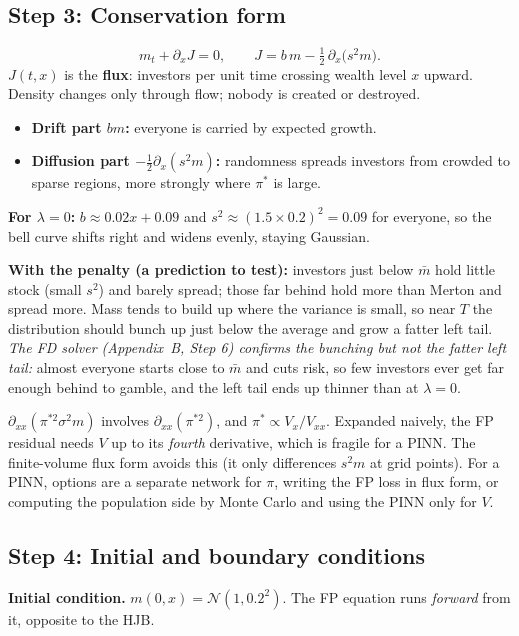 \documentclass[11pt]{article}
\newcommand{\mb}{\bar m}
\begin{document}
\subsection*{Step 3: Conservation form}
\[
  m_t + \partial_xJ = 0,\qquad J = b\,m - \tfrac12\,\partial_x\bigl(s^2m\bigr).
\]
$J(t,x)$ is the \textbf{flux}: investors per unit time crossing wealth level $x$ upward.
Density changes only through flow; nobody is created or destroyed.
\begin{itemize}
  \item \textbf{Drift part $bm$:} everyone is carried by expected growth.
  \item \textbf{Diffusion part $-\tfrac12\partial_x(s^2m)$:} randomness spreads investors from
        crowded to sparse regions, more strongly where $\pi^*$ is large.
\end{itemize}
\textbf{For $\lambda=0$:} $b\approx0.02x+0.09$ and $s^2\approx(1.5\times0.2)^2=0.09$ for
everyone, so the bell curve shifts right and widens evenly, staying Gaussian.

\textbf{With the penalty (a prediction to test):} investors just below $\mb$ hold little stock
(small $s^2$) and barely spread; those far behind hold more than Merton and spread more. Mass
tends to build up where the variance is small, so near $T$ the distribution should bunch up
just below the average and grow a fatter left tail. \emph{The FD solver (Appendix~B, Step 6)
confirms the bunching but not the fatter left tail:} almost everyone starts close to $\mb$ and
cuts risk, so few investors ever get far enough behind to gamble, and the left tail ends up
thinner than at $\lambda=0$.

\begin{caution}
$\partial_{xx}(\pi^{*2}\sigma^2m)$ involves $\partial_{xx}(\pi^{*2})$, and
$\pi^*\propto V_x/V_{xx}$. Expanded naively, the FP residual needs $V$ up to its
\emph{fourth} derivative, which is fragile for a PINN. The finite-volume flux form avoids
this (it only differences $s^2m$ at grid points). For a PINN, options are a separate network
for $\pi$, writing the FP loss in flux form, or computing the population side by Monte Carlo
and using the PINN only for $V$.
\end{caution}

\subsection*{Step 4: Initial and boundary conditions}
\textbf{Initial condition.} $m(0,x)=\mathcal N(1,0.2^2)$. The FP equation runs
\emph{forward} from it, opposite to the HJB.
\end{document}
